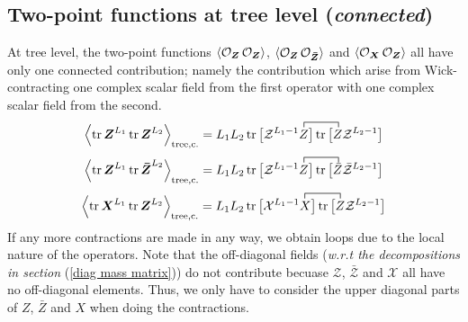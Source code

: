 \subsection{Two-point functions at tree level (\textit{connected})}
At tree level, the two-point functions $\expval{\mathcal{O}_{\boldsymbol{Z}} \, \mathcal{O}_{\boldsymbol{Z}}}$, $\expval{\mathcal{O}_{\boldsymbol{Z}} \, \mathcal{O}_{\boldsymbol{\bar{Z}}}}$ and $\expval{\mathcal{O}_{\boldsymbol{X}} \, \mathcal{O}_{\boldsymbol{Z}}}$ all have only one connected contribution; namely the contribution which arise from Wick-contracting one complex scalar field from the first operator with one complex scalar field from the second.
%
%
\begin{equation}\label{tree-level connected ZZ}
\expval{\tr \boldsymbol{Z}^{L_1} \tr \boldsymbol{Z}^{L_2}}_{\mathrm{tree,c.}}
=
\contraction{L_1 L_2 \tr \big[ \mathcal{Z}^{L_1 - 1} }
{Z}
{ \big] \tr \big[ }
{Z}
L_1 L_2 \tr \big[  \mathcal{Z}^{L_1 - 1} Z \big] 
\tr \big[ Z \mathcal{Z}^{L_2 - 1} \big]
\end{equation}
%
%
\begin{equation}\label{tree-level connected ZbarZ}
\expval{\tr \boldsymbol{Z}^{L_1} \tr \boldsymbol{\bar{Z}}^{L_2}}_{\mathrm{tree,c.}}
=
\contraction{L_1 L_2 \tr \big[ \mathcal{Z}^{L_1 - 1} }
{Z}
{ \big] \tr \big[ }
{\bar{Z}}
L_1 L_2 \tr \big[  \mathcal{Z}^{L_1 - 1} Z \big] 
\tr \big[ \bar{Z} \bar{\mathcal{Z}}^{L_2 - 1} \big]
\end{equation}
%
%
\begin{equation}\label{tree-level connected XZ}
\expval{\tr \boldsymbol{X}^{L_1} \tr \boldsymbol{Z}^{L_2}}_{\mathrm{tree,c.}}
=
\contraction{L_1 L_2 \tr \big[ \mathcal{Z}^{L_1 - 1} }
{X}
{ \big] \tr \big[ }
{Z}
L_1 L_2 \tr \big[  \mathcal{X}^{L_1 - 1} X \big] 
\tr \big[ Z \mathcal{Z}^{L_2 - 1} \big]
\end{equation}
%
%
If any more contractions are made in any way, we obtain loops due to the local nature of the operators. Note that the off-diagonal fields (\textit{w.r.t the decompositions in section} (\ref{diag mass matrix})) do not contribute becuase $\mathcal{Z}$, $\bar{\mathcal{Z}}$ and $\mathcal{X}$ all have no off-diagonal elements. Thus, we only have to consider the upper diagonal parts of $Z$, $\bar{Z}$ and $X$ when doing the contractions.

